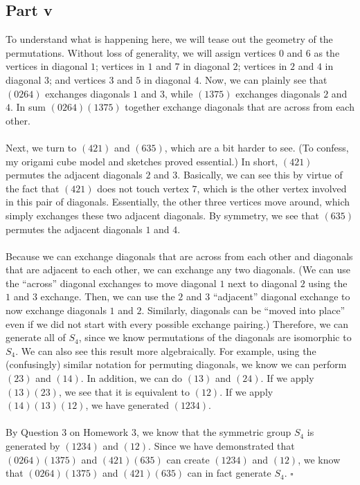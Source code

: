 \documentclass[letterpaper]{article}
\newcommand*{\QED}{\hfill\ensuremath{\square}}%
\begin{document}
\subsection{Part v}
\label{subs:1Partv}

To understand what is happening here, we will tease out the geometry of the permutations.
Without loss of generality, we will assign vertices $ 0 $ and $ 6 $ as the vertices in diagonal $ 1 $; vertices in $ 1 $ and $ 7 $ in diagonal $ 2 $; vertices in $ 2 $ and $ 4 $ in diagonal $ 3 $; and vertices $ 3 $ and $ 5 $ in diagonal $ 4 $.
Now, we can plainly see that $ (0264) $ exchanges diagonals $ 1 $ and $ 3 $, while $ (1375) $ exchanges diagonals $ 2 $ and $ 4 $.
In sum $ (0264)(1375) $ together exchange diagonals that are across from each other.
\\ \\
Next, we turn to $ (421) $ and $ (635) $, which are a bit harder to see.
(To confess, my origami cube model and sketches proved essential.)
In short, $ (421) $ permutes the adjacent diagonals $ 2 $ and $ 3 $.
Basically, we can see this by virtue of the fact that $ (421) $ does not touch vertex $ 7 $, which is the other vertex involved in this pair of diagonals.
Essentially, the other three vertices move around, which simply exchanges these two adjacent diagonals.
By symmetry, we see that $ (635) $ permutes the adjacent diagonals $ 1 $ and $ 4 $.
\\ \\
Because we can exchange diagonals that are across from each other and diagonals that are adjacent to each other, we can exchange any two diagonals.
(We can use the ``across'' diagonal exchanges to move diagonal $ 1 $ next to diagonal $ 2 $ using the $ 1 $ and $ 3 $ exchange.
Then, we can use the $ 2 $ and $ 3 $ ``adjacent'' diagonal exchange to now exchange diagonals $ 1 $ and $ 2 $.
Similarly, diagonals can be ``moved into place'' even if we did not start with every possible exchange pairing.)
Therefore, we can generate all of $ S_4 $, since we know permutations of the diagonals are isomorphic to $ S_4 $.
We can also see this result more algebraically.
For example, using the (confusingly) similar notation for permuting diagonals, we know we can perform $ (23) $ and $ (14) $.
In addition, we can do $ (13) $ and $ (24) $.
If we apply $ (13)(23) $, we see that it is equivalent to $ (12) $.
If we apply $ (14)(13)(12) $, we have generated $ (1234) $.
\\ \\
By Question 3 on Homework 3, we know that the symmetric group $ S_4 $ is generated by $ (1234) $ and $ (12) $.
Since we have demonstrated that $ (0264)(1375) $ and $ (421)(635) $ can create $ (1234) $ and $ (12) $, we know that $ (0264)(1375) $ and $ (421)(635) $ can in fact generate $ S_4 $.
\QED{}
\end{document}
